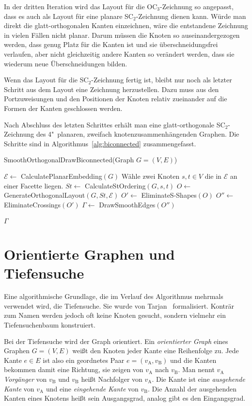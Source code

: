 \documentclass[a4paper]{scrreprt}
\theoremstyle{definition}
\newcommand{\Epsilon}{\mathcal{E}}
\begin{document}
In der dritten Iteration wird das Layout für die OC$_3$-Zeichnung so angepasst, dass es auch als Layout für eine planare SC$_2$-Zeichnung dienen kann. Würde man direkt die glatt-orthogonalen Kanten einzeichnen, wäre die entstandene Zeichnung in vielen Fällen nicht planar. Darum müssen die Knoten so auseinandergezogen werden, dass genug Platz für die Kanten ist und sie überschneidungsfrei verlaufen, aber nicht gleichzeitig andere Kanten so verändert werden, dass sie wiederum neue Überschneidungen bilden.

Wenn das Layout für die SC$_2$-Zeichnung fertig ist, bleibt nur noch als letzter Schritt aus dem Layout eine Zeichnung herzustellen. Dazu muss aus den Portzuweisungen und den Positionen der Knoten relativ zueinander auf die Formen der Kanten geschlossen werden.

Nach Abschluss des letzten Schrittes erhält man eine glatt-orthogonale SC$_2$-Zeichnung des 4"~planaren, zweifach knotenzusammenhängenden Graphen. Die Schritte sind in Algorithmus~\ref{alg:biconnected} zusammengefasst.

\begin{algorithm}[ht]
  \caption{SmoothOrthogonalDrawBiconnected(Graph $G = (V,E)$)}
  \label{alg:biconnected}
  
  $\Epsilon \leftarrow$ CalculatePlanarEmbedding$(G)$ \;
  Wähle zwei Knoten $s, t \in V$ die in $\Epsilon$ an einer Facette liegen.\;
  $St \leftarrow$ CalculateStOrdering$(G, s, t)$ \;
  $O \leftarrow$ GenerateOrthogonalLayout$(G,St,\Epsilon)$ \;
  $O' \leftarrow$ EliminateS-Shapes$(O)$ \;
  $O'' \leftarrow$ EliminateCrossings$(O')$ \;
  $\Gamma \leftarrow$ DrawSmoothEdges$(O'')$ \;
  
  \Return $\Gamma$
\end{algorithm}

\section{Orientierte Graphen und Tiefensuche}

Eine algorithmische Grundlage, die im Verlauf des Algorithmus mehrmals verwendet wird, die Tiefensuche. Sie wurde von Tarjan~\cite{tarjan-72} formalisiert. Konträr zum Namen werden jedoch oft keine Knoten gesucht, sondern vielmehr ein Tiefensuchenbaum konstruiert.

Bei der Tiefensuche wird der Graph orientiert. Ein \emph{orientierter Graph} eines Graphen $G = (V, E)$ weißt den Knoten jeder Kante eine Reihenfolge zu. Jede Kante $e \in E$ ist also ein geordnetes Paar $e = (v_\text{A}, v_\text{B})$ und die Kanten bekommen damit eine Richtung, sie zeigen von $v_\text{A}$ nach $v_\text{B}$. Man nennt $v_\text{A}$ \emph{Vorgänger} von $v_\text{B}$ und $v_\text{B}$ heißt Nachfolger von $v_\text{A}$. Die Kante ist eine \emph{ausgehende Kante} von $v_\text{A}$ und eine \emph{eingehende Kante} von $v_\text{B}$. Die Anzahl der ausgehenden Kanten eines Knotens heißt sein Ausgangsgrad, analog gibt es den Eingangsgrad.
\end{document}
